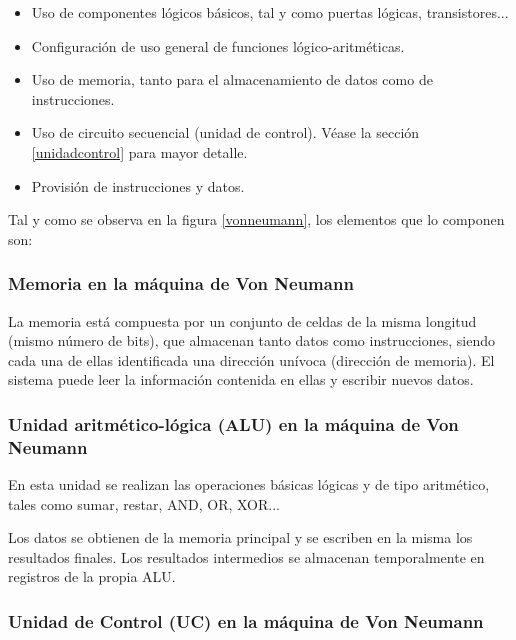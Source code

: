 \documentclass[a4paper, 11pt, titlepage]{article}
\begin{document}
        \begin{itemize}
            \item Uso de componentes lógicos básicos, tal y como puertas lógicas, transistores... 
            \item Configuración de uso general de funciones lógico-aritméticas.
            \item Uso de memoria, tanto para el almacenamiento de datos como de instrucciones.
            \item Uso de circuito secuencial (unidad de control). Véase la sección \ref{unidadcontrol} 
            para mayor detalle.
            \item Provisión de instrucciones y datos.
        \end{itemize}

        Tal y como se observa en la figura \ref{vonneumann}, los elementos que lo componen son:

        \subsubsection{Memoria en la máquina de Von Neumann}

            La memoria está compuesta por un conjunto de celdas de la misma longitud (mismo número de
            bits), que almacenan tanto datos como instrucciones, siendo cada una de ellas identificada 
            una dirección unívoca (dirección de memoria). El sistema puede leer la información contenida 
            en ellas y escribir nuevos datos.

        \subsubsection{Unidad aritmético-lógica (ALU) en la máquina de Von Neumann}

            En esta unidad se realizan las operaciones básicas lógicas y de tipo aritmético, 
            tales como sumar, restar, AND, OR, XOR...

            Los datos se obtienen de la memoria principal y se escriben en la misma los resultados 
            finales. Los resultados intermedios se almacenan temporalmente en registros de la propia 
            ALU.

        \subsubsection{Unidad de Control (UC) en la máquina de Von Neumann}
\end{document}
